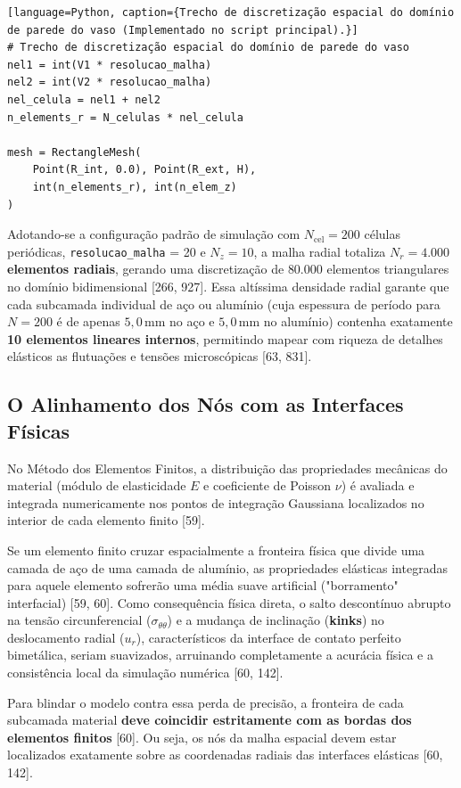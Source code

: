 \begin{verbatim}[language=Python, caption={Trecho de discretização espacial do domínio de parede do vaso (Implementado no script principal).}]
# Trecho de discretização espacial do domínio de parede do vaso
nel1 = int(V1 * resolucao_malha)
nel2 = int(V2 * resolucao_malha)
nel_celula = nel1 + nel2
n_elements_r = N_celulas * nel_celula

mesh = RectangleMesh(
    Point(R_int, 0.0), Point(R_ext, H),
    int(n_elements_r), int(n_elem_z)
)
\end{verbatim}

Adotando-se a configuração padrão de simulação com $N_{\text{cel}} = 200$ células periódicas, \texttt{resolucao\_malha} = 20 e $N_z = 10$, a malha radial totaliza \textbf{$N_r = 4.000$ elementos radiais}, gerando uma discretização de $80.000$ elementos triangulares no domínio bidimensional [266, 927]. Essa altíssima densidade radial garante que cada subcamada individual de aço ou alumínio (cuja espessura de período para $N=200$ é de apenas $5,0 \, \text{mm}$ no aço e $5,0 \, \text{mm}$ no alumínio) contenha exatamente \textbf{10 elementos lineares internos}, permitindo mapear com riqueza de detalhes elásticos as flutuações e tensões microscópicas [63, 831].

\subsection{O Alinhamento dos Nós com as Interfaces Físicas}

No Método dos Elementos Finitos, a distribuição das propriedades mecânicas do material (módulo de elasticidade $E$ e coeficiente de Poisson $\nu$) é avaliada e integrada numericamente nos pontos de integração Gaussiana localizados no interior de cada elemento finito [59].

Se um elemento finito cruzar espacialmente a fronteira física que divide uma camada de aço de uma camada de alumínio, as propriedades elásticas integradas para aquele elemento sofrerão uma média suave artificial ("borramento" interfacial) [59, 60]. Como consequência física direta, o salto descontínuo abrupto na tensão circunferencial ($\sigma_{\theta\theta}$) e a mudança de inclinação (\textbf{kinks}) no deslocamento radial ($u_r$), característicos da interface de contato perfeito bimetálica, seriam suavizados, arruinando completamente a acurácia física e a consistência local da simulação numérica [60, 142].

Para blindar o modelo contra essa perda de precisão, a fronteira de cada subcamada material \textbf{deve coincidir estritamente com as bordas dos elementos finitos} [60]. Ou seja, os nós da malha espacial devem estar localizados exatamente sobre as coordenadas radiais das interfaces elásticas [60, 142].

